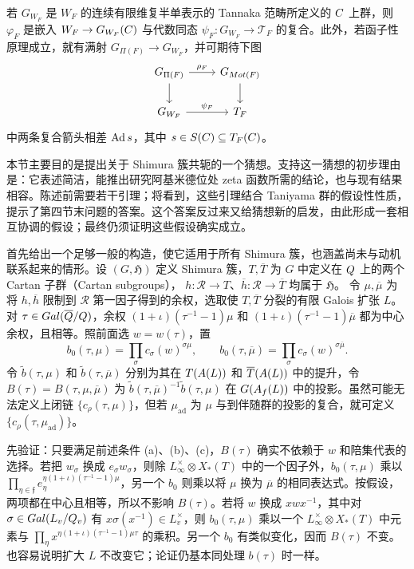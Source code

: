 若 $G_{W_F}$ 是 $W_F$ 的连续有限维复半单表示的 Tannaka 范畴所定义的
$C$ 上群，则 $\varphi_F$ 是嵌入 $W_F\to G_{W_F}(C)$ 与代数同态
$\psi_F:G_{W_F}\to\mathcal T_F$ 的复合。此外，若函子性原理成立，就有满射
$G_{\Pi(F)}\to G_{W_F}$，并可期待下图
\[
\begin{tikzcd}
G_{\Pi(F)}\arrow[r,"\rho_F"]\arrow[d]&G_{\operatorname{Mot}(F)}\arrow[d]\\
G_{W_F}\arrow[r,"\psi_F"]&\mathcal T_F
\end{tikzcd}
\]
中两条复合箭头相差 $\Ad s$，其中 $s\in S(C)\subseteq T_F(C)$。

本节主要目的是提出关于 Shimura 簇共轭的一个猜想。支持这一猜想的初步理由是：它表述简洁，能推出研究阿基米德位处 zeta 函数所需的结论，也与现有结果相容。陈述前需要若干引理；将看到，这些引理结合 Taniyama 群的假设性性质，提示了第四节末问题的答案。这个答案反过来又给猜想新的启发，由此形成一套相互协调的假设；最终仍须证明这些假设确实成立。

首先给出一个足够一般的构造，使它适用于所有 Shimura 簇，也涵盖尚未与动机联系起来的情形。设
$(G,\mathfrak H)$ 定义 Shimura 簇，$T,\overline T$ 为 $G$ 中定义在 $Q$ 上的两个 Cartan 子群（Cartan subgroups），
$h:\mathcal R\to T$、$\overline h:\mathcal R\to\overline T$ 均属于 $\mathfrak H$。
令 $\mu,\overline\mu$ 为将 $h,\overline h$ 限制到 $\mathcal R$ 第一因子得到的余权，选取使
$T,\overline T$ 分裂的有限 Galois 扩张 $L$。对
$\tau\in Gal(\overline{Q}/Q)$，余权
$(1+\iota)(\tau^{-1}-1)\mu$ 和
$(1+\iota)(\tau^{-1}-1)\overline\mu$ 都为中心余权，且相等。照前面选
$w=w(\tau)$，置
\[
b_0(\tau,\mu)=\prod_\sigma c_\sigma(w)^{\sigma\mu},\qquad
b_0(\tau,\overline\mu)=\prod_\sigma c_\sigma(w)^{\sigma\overline\mu}.
\]
令 $\widetilde b(\tau,\mu)$ 和 $\widetilde b(\tau,\overline\mu)$ 分别为其在
$T(A(L))$ 和 $\overline T(A(L))$ 中的提升，令
$B(\tau)=B(\tau,\mu,\overline\mu)$ 为
$\widetilde b(\tau,\overline\mu)^{-1}\widetilde b(\tau,\mu)$ 在
$G(A_f(L))$ 中的投影。虽然可能无法定义上闭链
$\{c_\rho(\tau,\mu)\}$，但若 $\mu_{\mathrm{ad}}$ 为 $\mu$ 与到伴随群的投影的复合，就可定义
$\{c_\rho(\tau,\mu_{\mathrm{ad}})\}$。

先验证：只要满足前述条件 (a)、(b)、(c)，$B(\tau)$ 确实不依赖于
$w$ 和陪集代表的选择。若把 $w_\sigma$ 换成 $e_\sigma w_\sigma$，则除
$L_\infty^\times\otimes X_*(T)$ 中的一个因子外，$b_0(\tau,\mu)$ 乘以
$\prod_{\eta\in\mathfrak f}e_\eta^{\eta(1+\iota)(\tau^{-1}-1)\mu}$，另一个
$b_0$ 则乘以将 $\mu$ 换为 $\overline\mu$ 的相同表达式。按假设，两项都在中心且相等，所以不影响
$B(\tau)$。若将 $w$ 换成 $xwx^{-1}$，其中对
$\sigma\in Gal(L_v/Q_v)$ 有 $x\sigma(x^{-1})\in L_v^\times$，则
$b_0(\tau,\mu)$ 乘以一个 $L_\infty^\times\otimes X_*(T)$ 中元素与
$\prod_\eta x^{\eta(1+\iota)(\tau^{-1}-1)\mu\tau}$ 的乘积。另一个 $b_0$ 有类似变化，因而
$B(\tau)$ 不变。也容易说明扩大 $L$ 不改变它；论证仍基本同处理 $b(\tau)$ 时一样。

